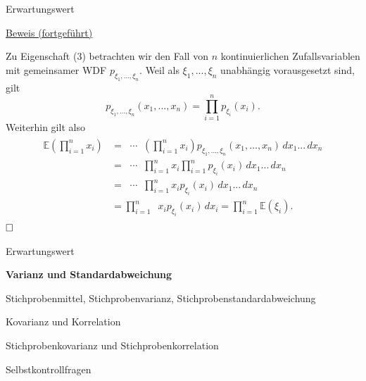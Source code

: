 \documentclass[
  8pt,
  ignorenonframetext,
]{beamer}
\DeclareMathOperator*{\intinf}{\int_{-\infty}^{\infty}}
\begin{document}
\begin{frame}{Erwartungswert}
\protect\hypertarget{erwartungswert-8}{}
\footnotesize

\underline{Beweis (fortgeführt)}

Zu Eigenschaft (3) betrachten wir den Fall von \(n\) kontinuierlichen
Zufallsvariablen mit gemeinsamer WDF \(p_{\xi_1,...,\xi_n}\). Weil als
\(\xi_1,...,\xi_n\) unabhängig vorausgesetzt sind, gilt \begin{equation}
p_{\xi_1,...,\xi_n}(x_1,...,x_n) = \prod_{i=1}^n p_{\xi_i}(x_i).
\end{equation} Weiterhin gilt also \begin{align}
\begin{split}
\mathbb{E}\left(\prod_{i=1}^n x_i\right)
& = \intinf\cdots\intinf \left(\prod_{i=1}^n x_i\right)
        p_{\xi_1,...,\xi_n}(x_1,...,x_n) \,dx_1...\,dx_n    \\
& = \intinf\cdots\intinf  \prod_{i=1}^n x_i
         \prod_{i=1}^n p_{\xi_i}(x_i)\,dx_1...\,dx_n    \\
& = \intinf\cdots \intinf  \prod_{i=1}^n x_i p_{\xi_i}(x_i) \,dx_1...\,dx_n \\
& = \prod_{i=1}^n \intinf x_i p_{\xi_i}(x_i) \,dx_i 
 = \prod_{i=1}^n \mathbb{E}(\xi_i).
\end{split}
\end{align} \(\hfill \Box\)
\end{frame}

\begin{frame}{}
\protect\hypertarget{section-7}{}
\large
\vfill

Erwartungswert

\textbf{Varianz und Standardabweichung}

Stichprobenmittel, Stichprobenvarianz, Stichprobenstandardabweichung

Kovarianz und Korrelation

Stichprobenkovarianz und Stichprobenkorrelation

Selbstkontrollfragen \vfill
\end{frame}
\end{document}
